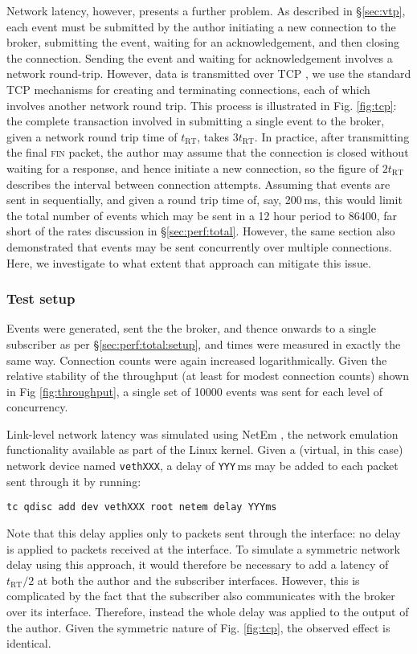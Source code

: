 \documentclass[5p,authoryear]{elsarticle}
\begin{document}
Network latency, however, presents a further problem. As described in
\S\ref{sec:vtp}, each event must be submitted by the author initiating a new
connection to the broker, submitting the event, waiting for an
acknowledgement, and then closing the connection. Sending the event and
waiting for acknowledgement involves a network round-trip.  However, data is
transmitted over TCP \citep{Cerf:1974}, we use the standard TCP mechanisms for
creating and terminating connections, each of which involves another network
round trip. This process is illustrated in Fig. \ref{fig:tcp}: the complete
transaction involved in submitting a single event to the broker, given a
network round trip time of $t_\mathrm{RT}$, takes $3 t_\mathrm{RT}$. In
practice, after transmitting the final \textsc{fin} packet, the author may
assume that the connection is closed without waiting for a response, and hence
initiate a new connection, so the figure of $2 t_\mathrm{RT}$ describes the
interval between connection attempts.  Assuming that events are sent in
sequentially, and given a round trip time of, say, 200\,ms, this would limit
the total number of events which may be sent in a 12 hour period to 86400, far
short of the rates discussion in \S\ref{sec:perf:total}. However, the same
section also demonstrated that events may be sent concurrently over multiple
connections. Here, we investigate to what extent that approach can mitigate
this issue.

\subsubsection{Test setup}

Events were generated, sent the the broker, and thence onwards to a single
subscriber as per \S\ref{sec:perf:total:setup}, and times were measured in
exactly the same way. Connection counts were again increased logarithmically.
Given the relative stability of the throughput (at least for modest connection
counts) shown in Fig \ref{fig:throughput}, a single set of 10000 events was
sent for each level of concurrency.

Link-level network latency was simulated using NetEm \citep{Hemminger:2005},
the network emulation functionality available as part of the Linux kernel.
Given a (virtual, in this case) network device named \texttt{vethXXX}, a
delay of \texttt{YYY}\,ms may be added to each packet sent through it by
running:
\begin{verbatim}
tc qdisc add dev vethXXX root netem delay YYYms
\end{verbatim}
Note that this delay applies only to packets sent through the interface: no
delay is applied to packets received at the interface. To simulate a symmetric
network delay using this approach, it would therefore be necessary to add a
latency of $t_\mathrm{RT} / 2$ at both the author and the subscriber
interfaces. However, this is complicated by the fact that the subscriber also
communicates with the broker over its interface. Therefore, instead the whole
delay was applied to the output of the author. Given the symmetric nature of
Fig. \ref{fig:tcp}, the observed effect is identical.
\end{document}
